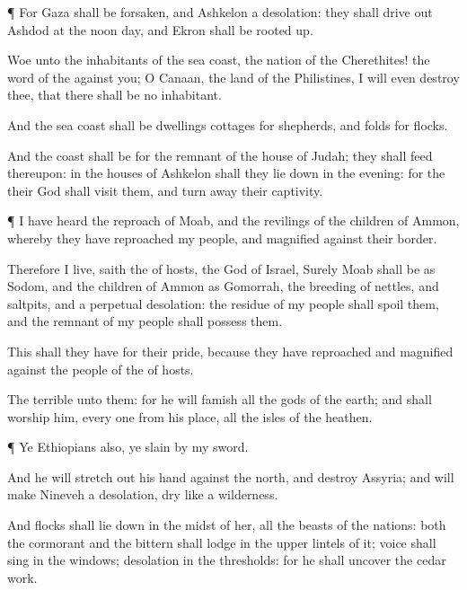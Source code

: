{\par }{\PP {}¶ For
Gaza shall be
forsaken, and
Ashkelon a
desolation: they shall drive
out
Ashdod at the noon
day, and
Ekron shall be rooted
up.

Woe unto the
inhabitants of the
sea
coast, the
nation of the
Cherethites! the
word of the
{}
{} against you; O
Canaan, the
land of the
Philistines, I will even
destroy thee, that there shall be no
inhabitant.

And the
sea
coast shall be
dwellings
{}
cottages for
shepherds, and
folds for
flocks.

And the
coast shall be for the
remnant of the
house of
Judah; they shall
feed thereupon: in the
houses of
Ashkelon shall they lie
down in the
evening: for the
{} their
God shall
visit them, and turn
away their
captivity.


\par }{\PP {}¶ I have
heard the
reproach of
Moab, and the
revilings of the
children of
Ammon, whereby they have
reproached my
people, and
magnified
{} against their
border.

Therefore
{} I
live,
saith the
{} of
hosts, the
God of
Israel, Surely
Moab shall be as
Sodom, and the
children of
Ammon as
Gomorrah,
{} the
breeding of
nettles, and
saltpits, and a
perpetual
desolation: the
residue of my
people shall
spoil them, and the
remnant of my
people shall
possess them.

This shall they have for their
pride, because they have
reproached and
magnified
{} against the
people of the
{} of
hosts.

The
{}
{}
terrible unto them: for he will
famish all the
gods of the
earth; and
{} shall
worship him, every
one from his
place,
{} all the
isles of the
heathen.


\par }{\PP {}¶ Ye
Ethiopians also,
ye
{}
slain by my
sword.

And he will stretch
out his
hand against the
north, and
destroy
Assyria; and will
make
Nineveh a
desolation,
{}
dry like a
wilderness.

And
flocks shall lie
down in the
midst of her, all the
beasts of the
nations: both the
cormorant and the
bittern shall
lodge in the upper
lintels of it;
{}
voice shall
sing in the
windows;
desolation
{} in the
thresholds: for he shall
uncover the cedar
work.

}
